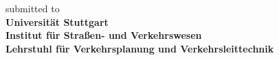 \begin{titlepage}
\begin{flushleft}
\begin{minipage}{0.2\textwidth}
\begin{flushright}
	\hfill
	\end{flushright}
\end{minipage}
\begin{minipage}{0.75\textwidth}
         {\small submitted to} \\
         {\bf Universität Stuttgart} \\
         {\bf Institut für Straßen- und Verkehrswesen}\\
         {\bf Lehrstuhl für Verkehrsplanung und Verkehrsleittechnik}\\
\end{minipage}
\end{flushleft}
\end{titlepage}

\clearpage
\thispagestyle{empty}
